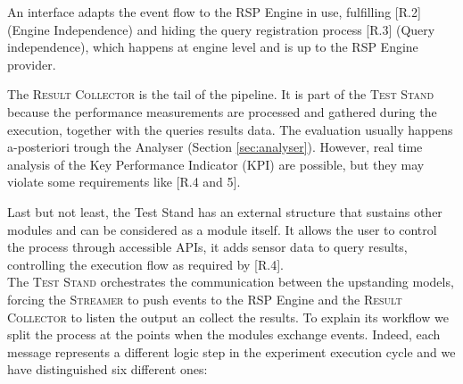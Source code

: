 An interface adapts the event flow to the RSP Engine in use, fulfilling [R.2] (Engine Independence) and hiding the query registration process [R.3] (Query independence), which happens at engine level and is up to the RSP Engine provider.

The \textsc{Result Collector} is the tail of the pipeline. It is part of the \textsc{Test Stand} because the performance measurements are processed and gathered during the execution, together with the queries results data.  The evaluation usually happens a-posteriori trough the Analyser (Section \ref{sec:analyser}). However, real time analysis  of the  Key Performance Indicator (KPI) are possible, but they may violate some requirements like [R.4 and 5]. 

Last but not least, the Test Stand has an external structure that sustains other modules and can be considered as a module itself. It allows the user to control the process through accessible APIs, it adds sensor data to query results, controlling the execution flow as required by [R.4]. \\

\noindent The \textsc{Test Stand} orchestrates the communication between the upstanding models, forcing the \textsc{Streamer} to push events to the RSP Engine and the \textsc{Result Collector} to listen the output an collect the results.  To explain its workflow we split the process at the points when the modules exchange events. Indeed, each message represents a different logic step in the experiment execution cycle and we have distinguished six different ones:\\

\pagebreak

